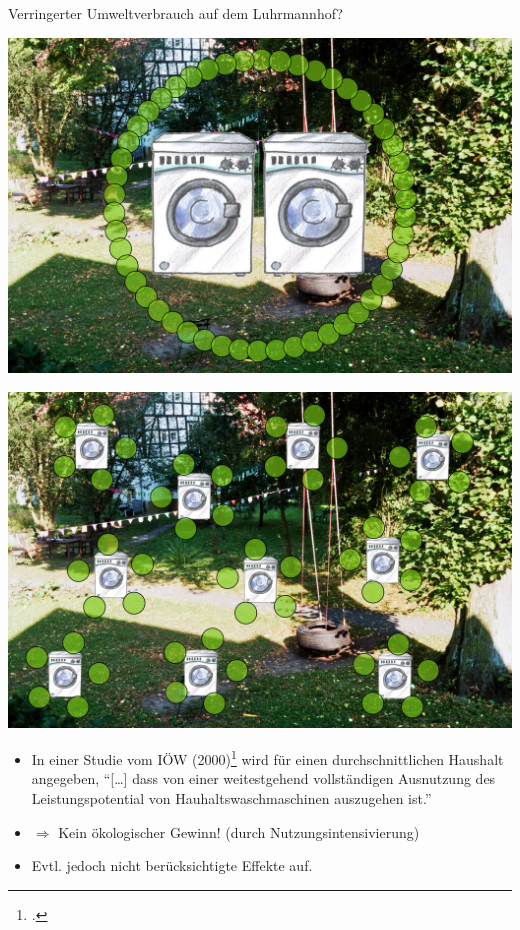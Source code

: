 \documentclass[beamer, xcolor={table,usenames,dvipsnames}]{beamer}
\newcommand{\n}[1]{n_\text{#1}}
\renewcommand{\t}[1]{t_\text{#1}}
\begin{document}
    \begin{frame}{Verringerter Umweltverbrauch auf dem Luhrmannhof?}
        \begin{minipage}[t]{0.45\textwidth}
            \includegraphics[width=\textwidth]{Luhrmannhof50x2.pdf}
        \end{minipage}
        \hfill
        \begin{minipage}[t]{0.45\textwidth}
            \includegraphics[width=\textwidth]{Luhrmannhof10x5.pdf}
        \end{minipage}
        \begin{itemize}
            \item In einer Studie vom IÖW
                (2000)\footcite[S.57]{hirschl_produkte_2000} wird für einen
                durchschnittlichen Haushalt angegeben, "`[\dots] dass von einer
                weitestgehend vollständigen Ausnutzung des Leistungspotential
                von Hauhaltswaschmaschinen auszugehen ist."' 
            \item[] $\Rightarrow$ Kein ökologischer Gewinn! (durch
                Nutzungsintensivierung)
            \item Evtl. jedoch nicht berücksichtigte Effekte auf.
        \end{itemize}
    \end{frame}
\end{document}
